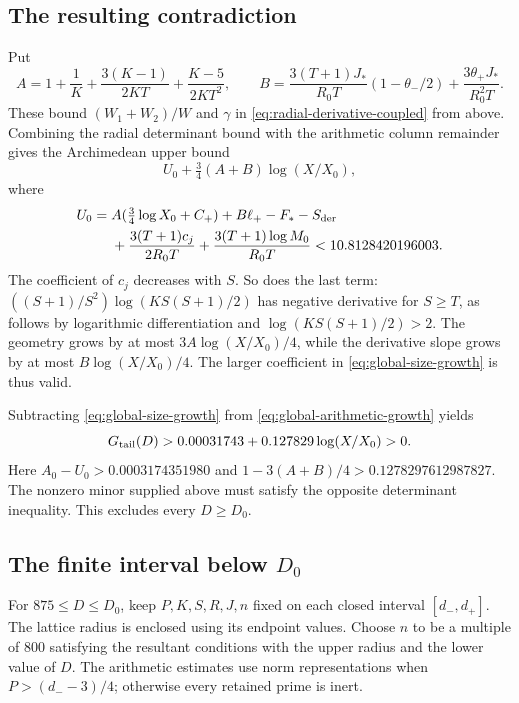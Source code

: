 \subsection{The resulting contradiction}
Put
\[
 A=1+\frac1K+\frac{3(K-1)}{2KT}+\frac{K-5}{2KT^2},\qquad
 B=\frac{3(T+1)J_*}{R_0T}(1-\theta_-/2)
                     +\frac{3\theta_+J_*}{R_0^2T}.
\]
These bound $(W_1+W_2)/W$ and $\gamma$ in
\eqref{eq:radial-derivative-coupled} from above.
Combining the radial determinant bound with the arithmetic column
remainder gives the Archimedean upper bound
\begin{equation}\label{eq:global-size-growth}
 U_0+\tfrac34(A+B)\log(X/X_0),
\end{equation}
where
\begin{align}
 U_0={}&A(\tfrac34\log X_0+C_+)+B\ell_+-F_*-S_{\rm der}\notag\\
 &+\frac{3(T+1)c_j}{2R_0T}
                         +\frac{3(T+1)\log M_0}{R_0T}
       <10.8128420196003.                  \label{eq:global-U0}
\end{align}
The coefficient of $c_j$ decreases with $S$. So does the last term:
$((S+1)/S^2)\log(KS(S+1)/2)$ has negative derivative for $S\geq T$,
as follows by logarithmic differentiation and $\log(KS(S+1)/2)>2$.
The geometry grows by at most $3A\log(X/X_0)/4$, while the derivative
slope grows by at most $B\log(X/X_0)/4$.
The larger coefficient in \eqref{eq:global-size-growth} is thus valid.

Subtracting \eqref{eq:global-size-growth} from
\eqref{eq:global-arithmetic-growth} yields
\begin{equation}\label{eq:tail-positive}
 G_{\rm tail}(D)>0.00031743+0.127829\log(X/X_0)>0.
\end{equation}
Here $A_0-U_0>0.0003174351980$ and
$1-3(A+B)/4>0.1278297612987827$.
The nonzero minor supplied above must satisfy the opposite determinant
inequality. This excludes every $D\geq D_0$.

\subsection{The finite interval below \texorpdfstring{$D_0$}{D0}}
For $875\leq D\leq D_0$, keep $P,K,S,R,J,n$ fixed on each closed
interval $[d_-,d_+]$. The lattice radius is enclosed using its endpoint
values. Choose $n$ to be a multiple of $800$ satisfying the resultant
conditions with the upper radius and the lower value of $D$.
The arithmetic estimates use norm representations when $P>(d_--3)/4$;
otherwise every retained prime is inert.

